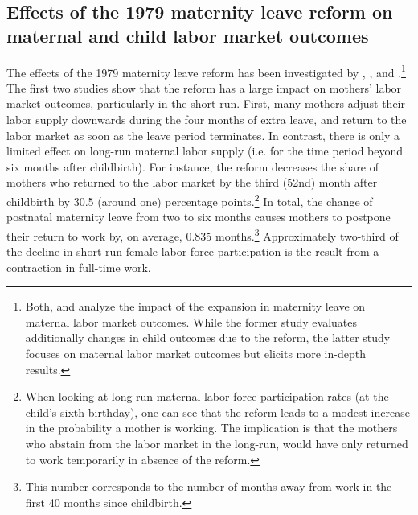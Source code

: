 \documentclass[11pt, a4paper]{article} %
\begin{document}
\subsection[Effects of 1979 reform on outcomes]{Effects of the 1979 maternity leave reform on maternal and child labor market outcomes}
The effects of the 1979 maternity leave reform has been investigated by \cite{Dustmann2012}, \cite{schonberg2014expansions}, and \cite{guertzgen2018}.\footnote{Both, \cite{Dustmann2012} and \cite{schonberg2014expansions} analyze the impact of the expansion in maternity leave on maternal labor market outcomes. While the former study evaluates additionally changes in child outcomes due to the reform, the latter study focuses on maternal labor market outcomes but elicits more in-depth results.} The first two studies show that the reform has a large impact on mothers' labor market outcomes, particularly in the short-run. \newline First, many mothers adjust their labor supply downwards during the four months of extra leave, and return to the labor market as soon as the leave period terminates. In contrast, there is only a limited effect on long-run maternal labor supply (i.e. for the time period beyond six months after childbirth). For instance, the reform decreases the share of mothers who returned to the labor market by the third (52nd) month after childbirth by 30.5 (around one) percentage points.\footnote{When looking at long-run maternal labor force participation rates (at the child's sixth birthday), one can see that the reform leads to a modest increase in the probability a mother is working. The implication is that the mothers who abstain from the labor market in the long-run, would have only returned to work temporarily in absence of the reform.}
In total, the change of postnatal maternity leave from two to six months causes mothers to postpone their return to work by, on average, 0.835 months.\footnote{This number corresponds to the number of months away from work in the first 40 months since childbirth.} Approximately two-third of the decline in short-run female labor force participation is the result from a contraction in full-time work. \newline
\end{document}
